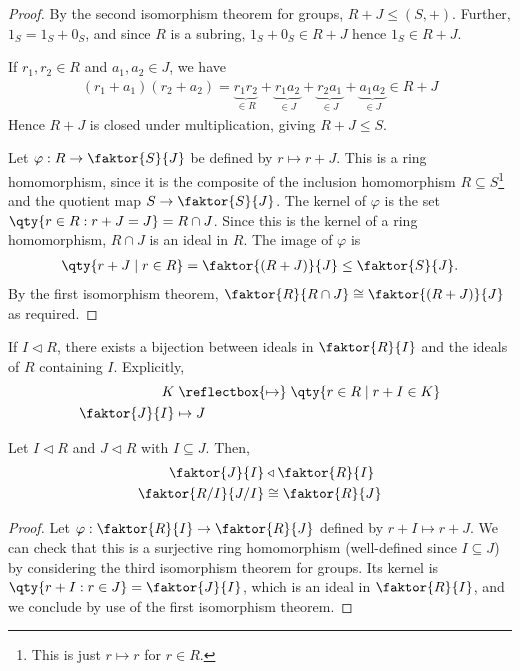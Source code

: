 \begin{proof}
	By the second isomorphism theorem for groups, $R+J \leq (S, +)$.
	Further, $1_S = 1_S + 0_S$, and since $R$ is a subring, $1_S + 0_S \in R + J$ hence $1_S \in R + J$.

	If $r_1, r_2 \in R$ and $a_1, a_2 \in J$, we have
	\begin{align*}
		(r_1 + a_1)(r_2 + a_2) = \underbrace{r_1 r_2}_{\in R} + \underbrace{r_1 a_2}_{\in J} + \underbrace{r_2 a_1}_{\in J} + \underbrace{a_1 a_2}_{\in J} \in R + J
	\end{align*}
	Hence $R+J$ is closed under multiplication, giving $R+J \leq S$.

	Let $\varphi : R \to \faktor{S}{J}$ be defined by $r \mapsto r + J$.
	This is a ring homomorphism, since it is the composite of the inclusion homomorphism $R \subseteq S$\footnote{This is just $r \mapsto r$ for $r \in R$.} and the quotient map $S \to \faktor{S}{J}$.
	The kernel of $\varphi$ is the set $\qty{r \in R : r+J = J} = R \cap J$.
	Since this is the kernel of a ring homomorphism, $R \cap J$ is an ideal in $R$.
	The image of $\varphi$ is \begin{align*}
		\qty{r+J \mid r \in R} = \faktor{(R+J)}{J} \leq \faktor{S}{J}.
	\end{align*}
	By the first isomorphism theorem, $\faktor{R}{R \cap J} \cong \faktor{(R+J)}{J}$ as required.
\end{proof}

\begin{remark} \label{rem:correspondence}
	If $I \triangleleft R$, there exists a bijection between ideals in $\faktor{R}{I}$ and the ideals of $R$ containing $I$.
	Explicitly,
	\begin{align*}
		K &\mathrel{\reflectbox{\ensuremath{\mapsto}}} \qty{r \in R \mid r + I \in K} \\
		\faktor{J}{I} &\mapsto J
	\end{align*}
\end{remark}

\begin{theorem}
	Let $I \triangleleft R$ and $J \triangleleft R$ with $I \subseteq J$.
	Then,
	\begin{align*}
		\faktor{J}{I} &\triangleleft \faktor{R}{I} \\ 
		\faktor{R/I}{J/I} &\cong \faktor{R}{J}
	\end{align*}
\end{theorem}

\begin{proof}
	Let $\varphi : \faktor{R}{I} \to \faktor{R}{J}$ defined by $r+I \mapsto r+J$.
	We can check that this is a surjective ring homomorphism (well-defined since $I \subseteq J$) by considering the third isomorphism theorem for groups.
	Its kernel is $\qty{r + I : r \in J} = \faktor{J}{I}$, which is an ideal in $\faktor{R}{I}$, and we conclude by use of the first isomorphism theorem.
\end{proof}

